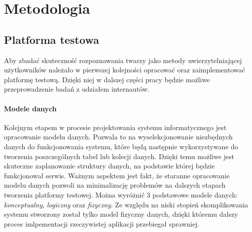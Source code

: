 \chapter{Metodologia}
\section{Platforma testowa}
Aby zbadać skuteczność rozpoznawania twarzy jako metody uwierzytelniającej użytkowników należało w pierwszej kolejności opracować oraz zaimplementować platformę testową. Dzięki niej w dalszej części pracy będzie możliwe przeprowadzenie badań z udziałem internautów.



\subsubsection{Modele danych}
Kolejnym etapem w procesie projektowania systemu informatycznego jest opracowanie modelu danych. Pozwala to na wyselekcjonowanie niezbędnych danych do funkcjonowania systemu, które będą następnie wykorzystywane do tworzenia poszczególnych tabel lub kolecji danych. Dzięki temu możliwe jest skuteczne zaplanowanie struktury danych, na podstawie której będzie funkcjonował serwis. Ważnym aspektem jest fakt, że staranne opracowanie modelu danych pozwoli na minimalizację problemów na dalszych etapach tworzenia platformy testowej. Można wyróżnić 3 podstawowe modele danych: \emph{konceptualny}, \emph{logiczny} oraz \emph{fizyczny}. Ze względu na niski stopień skomplikowania systemu stworzony został tylko model fizyczny danych, dzięki któremu dalszy proces imlpementacji rzeczywistej aplikacji przebiegał sprawniej. 

